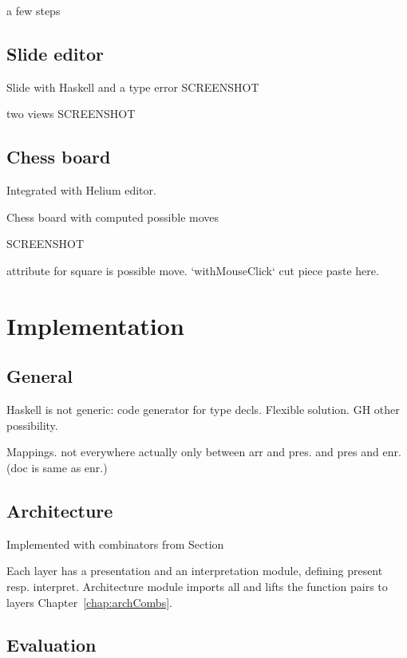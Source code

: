 a few steps



\subsection{Slide editor}
Slide with Haskell and a type error
SCREENSHOT

two views
SCREENSHOT



\subsection{Chess board}

Integrated with Helium editor.

Chess board with computed possible moves

SCREENSHOT

attribute for square is possible move. `withMouseClick` cut piece paste here.

\section{Implementation}

\subsection{General}

Haskell is not generic: code generator for type decls. Flexible solution. GH other possibility.

Mappings. not everywhere actually only between arr and pres. and pres and enr. (doc is same as enr.)

\subsection{Architecture}

Implemented with combinators from Section

Each layer has a presentation and an interpretation module, defining present resp. interpret. 
Architecture module imports all and lifts the function pairs to layers Chapter~\ref{chap:archCombs}. 


\subsection{Evaluation}

